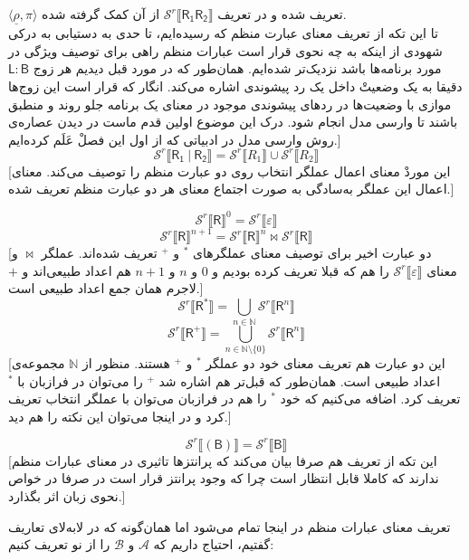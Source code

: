 \begin{defn}
$\langle \underline{\rho} , \pi \rangle$
تعریف شده و در تعریف 
$\mathcal{S}^r \llbracket\mathsf{R_1 R_2}\rrbracket$
از آن کمک گرفته شده.\\
تا این تکه از تعریف معنای عبارت منظم که رسیده‌ایم، تا حدی به دستیابی به درکی شهودی از اینکه به چه نحوی قرار است عبارات منظم راهی برای توصیف ویژگی‌ در مورد برنامه‌ها باشد نزدیک‌تر شده‌ایم. همان‌طور که در مورد قبل دیدیم هر زوج 
$\mathsf{L:B}$
دقیقا به یک وضعیتْ داخل یک رد پیشوندی اشاره می‌کند. انگار که قرار است این زوج‌ها موازی با وضعیت‌ها در ردهای پیشوندی موجود در معنای یک برنامه جلو روند و منطبق باشند تا وارسی مدل انجام شود. درک این موضوع اولین قدم ماست در دیدن عصاره‌ی روش وارسی مدل در ادبیاتی که از اول این فصلْ عَلَم کرده‌ایم.]
$$\mathcal{S}^r \llbracket\mathsf{R_1\:|\:R_2}\rrbracket= 
\mathcal{S}^r \llbracket R_1\rrbracket \cup
\mathcal{S}^r \llbracket R_2\rrbracket$$
[این موردْ معنای اعمال عملگر انتخاب روی دو عبارت منظم را توصیف می‌کند. معنای اعمال این عملگر به‌سادگی به صورت اجتماع معنای هر دو عبارت منظم تعریف شده.]

$$\mathcal{S}^r \llbracket\mathsf{R}\rrbracket^0 = \mathcal{S}^r\llbracket\varepsilon\rrbracket$$
$$\mathcal{S}^r \llbracket\mathsf{R}\rrbracket^{n+1} = \mathcal{S}^r \llbracket\mathsf{R}\rrbracket^{n} \Join
\mathcal{S}^r \llbracket\mathsf{R}\rrbracket$$
[دو عبارت اخیر برای توصیف معنای عملگرهای $^*$ و $^+$ تعریف شده‌اند. عملگر $\Join$ و معنای 
$\mathcal{S}^r\llbracket\varepsilon\rrbracket$
را هم که قبلا تعریف کرده بودیم و $0$ و $n$ و $n+1$ هم اعداد طبیعی‌اند و $+$ لاجرم همان جمع اعداد طبیعی است.]
$$\mathcal{S}^r\llbracket\mathsf{R^*}\rrbracket =  \bigcup_{n \in \mathbb{N}}
\mathcal{S}^r \llbracket\mathsf{R}^n\rrbracket$$
$$\mathcal{S}^r\llbracket\mathsf{R^+}\rrbracket =  \bigcup_{n \in \mathbb{N}\setminus\{0\}}
\mathcal{S}^r \llbracket\mathsf{R}^n\rrbracket$$
[این دو عبارت هم تعریف معنای خود دو عملگر $^*$ و $^+$ هستند. منظور از $\mathbb{N}$ مجموعه‌ی اعداد طبیعی است. همان‌طور که قبل‌تر هم اشاره شد $^+$ را می‌توان در فرازبان با $^*$ تعریف کرد. اضافه می‌کنیم که خود $^*$ را هم در فرازبان می‌توان با عملگر انتخاب تعریف کرد و در اینجا می‌توان این نکته را هم دید.]

$$\mathcal{S}^r \llbracket(\mathsf{B})\rrbracket=\mathcal{S}^r \llbracket\mathsf{B}\rrbracket$$
[این تکه از تعریف هم صرفا بیان می‌کند که پرانتزها تاثیری در معنای عبارات منظم ندارند که کاملا قابل انتظار است چرا که وجود پرانتز قرار است در صرفا در خواص نحوی زبان اثر بگذارد.]
\end{defn}
تعریف معنای عبارات منظم در اینجا تمام می‌شود اما همان‌گونه که در لا‌به‌لای تعاریف گفتیم، احتیاج داریم که $\mathcal{A}$ و $\mathcal{B}$ را از نو تعریف کنیم:
